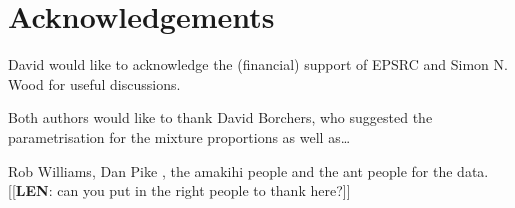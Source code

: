 \documentclass[useAMS,referee, usegraphicx]{biom}
\begin{document}

\backmatter


\section*{Acknowledgements}

David would like to acknowledge the (financial) support of EPSRC and Simon N. Wood for useful discussions.

Both authors would like to thank David Borchers, who suggested the parametrisation for the mixture proportions as well as\ldots

Rob Williams, Dan Pike , the amakihi people and the ant people for the data. [[\textbf{LEN}: can you put in the right people to thank here?]]



\end{document}
